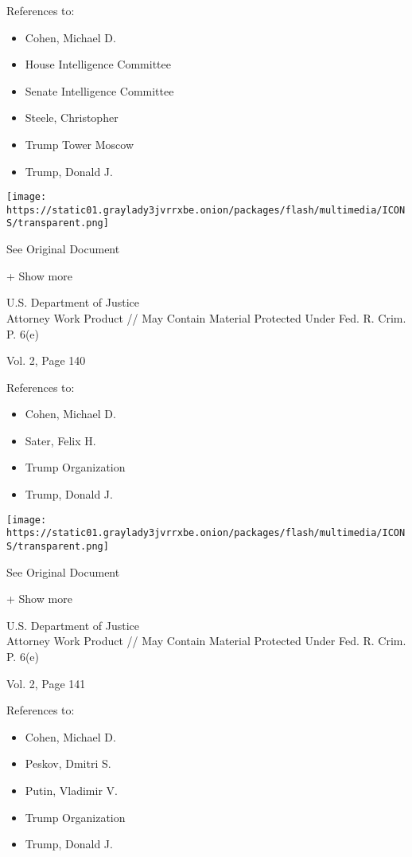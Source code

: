 References to:

\begin{itemize}
\tightlist
\item
  Cohen, Michael D.
\item
  House Intelligence Committee
\item
  Senate Intelligence Committee
\item
  Steele, Christopher
\item
  Trump Tower Moscow
\item
  Trump, Donald J.
\end{itemize}

\protect\hyperlink{}{}

\texttt{[image: https://static01.graylady3jvrrxbe.onion/packages/flash/multimedia/ICONS/transparent.png]}

See Original Document

+ Show more

U.S. Department of Justice\\
Attorney Work Product // May Contain Material Protected Under Fed. R.
Crim. P. 6(e)

Vol. 2, Page 140

References to:

\begin{itemize}
\tightlist
\item
  Cohen, Michael D.
\item
  Sater, Felix H.
\item
  Trump Organization
\item
  Trump, Donald J.
\end{itemize}

\protect\hyperlink{}{}

\texttt{[image: https://static01.graylady3jvrrxbe.onion/packages/flash/multimedia/ICONS/transparent.png]}

See Original Document

+ Show more

U.S. Department of Justice\\
Attorney Work Product // May Contain Material Protected Under Fed. R.
Crim. P. 6(e)

Vol. 2, Page 141

References to:

\begin{itemize}
\tightlist
\item
  Cohen, Michael D.
\item
  Peskov, Dmitri S.
\item
  Putin, Vladimir V.
\item
  Trump Organization
\item
  Trump, Donald J.
\end{itemize}

